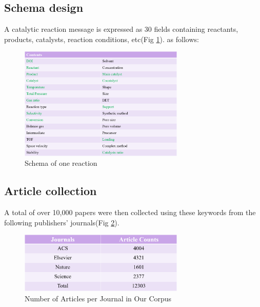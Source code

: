 \documentclass[%
 aip,
 jmp,%
 amsmath,amssymb,
 reprint,%
]{revtex4-2}
\begin{document}
\subsection{Schema design}
A catalytic reaction message is expressed as 30 fields containing reactants, products, catalysts, reaction conditions, etc(Fig \ref{ Fig.5 }). as follows:
\begin{figure}[htbp]
 \centering
 \includegraphics[width=0.7\textwidth]{figure/5.png}
 \caption{ Schema of one reaction }
 \label{ Fig.5 }
\end{figure}
\subsection{Article collection}
A total of over 10,000 papers were then collected using these keywords from the following publishers' journals(Fig \ref{ Fig.6 }).
\begin{figure}[htbp]
 \centering
 \includegraphics[width=0.7\textwidth]{figure/6.png}
 \caption{ Number of Articles per Journal in Our Corpus }
 \label{ Fig.6 }
\end{figure}
\end{document}
